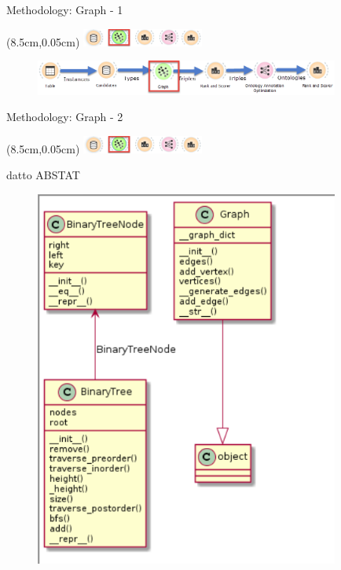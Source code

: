 \documentclass{beamer}
\begin{document}
\begin{frame}{Methodology: Graph - 1}
	\begin{textblock*}{4cm}(8.5cm,0.05cm) %
		\includegraphics[width=4cm]{images/header-graph.png}
	\end{textblock*}
	\begin{figure}
		\includegraphics[width=10cm]{images/diagrams-graph.png}
	\end{figure}
\end{frame}
\begin{frame}{Methodology: Graph - 2}
	\begin{textblock*}{4cm}(8.5cm,0.05cm) %
		\includegraphics[width=4cm]{images/header-graph.png}
	\end{textblock*}
	\begin{definition}
		datto ABSTAT
	\end{definition}
	\begin{figure}
		\includegraphics[width=10cm]{images/uml-graph-diagram.png}
	\end{figure}
\end{frame}
\end{document}
